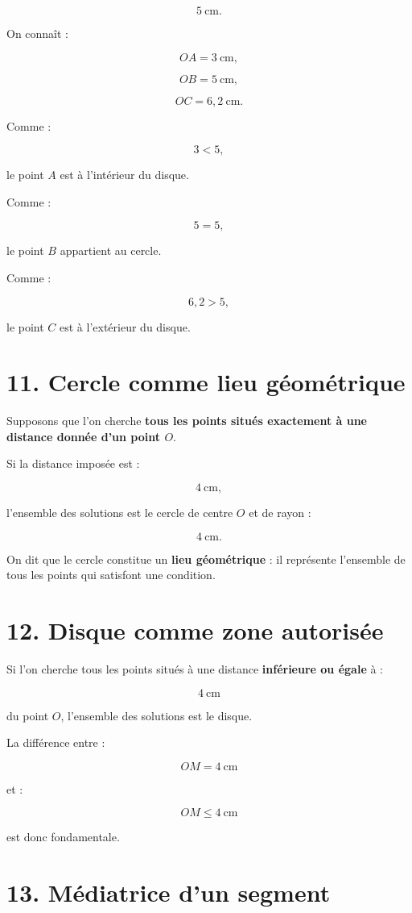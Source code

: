\[
5\ \text{cm}.
\]

On connaît :

\[
OA=3\ \text{cm},
\]

\[
OB=5\ \text{cm},
\]

\[
OC=6{,}2\ \text{cm}.
\]

Comme :

\[
3<5,
\]

le point $A$ est à l’intérieur du disque.

Comme :

\[
5=5,
\]

le point $B$ appartient au cercle.

Comme :

\[
6{,}2>5,
\]

le point $C$ est à l’extérieur du disque.

\section{11. Cercle comme lieu géométrique}

Supposons que l’on cherche \textbf{tous les points situés exactement à une distance donnée d’un point $O$}.

Si la distance imposée est :

\[
4\ \text{cm},
\]

l’ensemble des solutions est le cercle de centre $O$ et de rayon :

\[
4\ \text{cm}.
\]

On dit que le cercle constitue un \textbf{lieu géométrique} : il représente l’ensemble de tous les points qui satisfont une condition.

\section{12. Disque comme zone autorisée}

Si l’on cherche tous les points situés à une distance \textbf{inférieure ou égale} à :

\[
4\ \text{cm}
\]

du point $O$, l’ensemble des solutions est le disque.

La différence entre :

\[
OM=4\ \text{cm}
\]

et :

\[
OM\le4\ \text{cm}
\]

est donc fondamentale.

\section{13. Médiatrice d’un segment}

